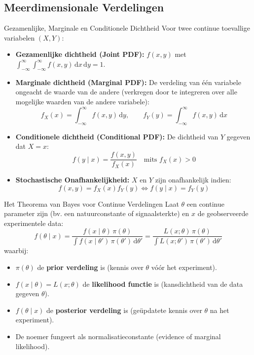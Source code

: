 \documentclass[11pt,a4paper]{article}
\newcommand{\dd}{\mathrm{d}}
\begin{document}
\subsection{Meerdimensionale Verdelingen}
\begin{defbox}{Gezamenlijke, Marginale en Conditionele Dichtheid}
Voor twee continue toevallige variabelen $(X, Y)$:
\begin{itemize}[leftmargin=1.2em]
    \item \textbf{Gezamenlijke dichtheid (Joint PDF):} $f(x, y)$ met $\int_{-\infty}^\infty \int_{-\infty}^\infty f(x, y) \, \dd x \, \dd y = 1$.
    \item \textbf{Marginale dichtheid (Marginal PDF):} De verdeling van één variabele ongeacht de waarde van de andere (verkregen door te integreren over alle mogelijke waarden van de andere variabele):
    \begin{equation}
        f_X(x) = \int_{-\infty}^\infty f(x, y) \, \dd y, \qquad f_Y(y) = \int_{-\infty}^\infty f(x, y) \, \dd x
    \end{equation}
    \item \textbf{Conditionele dichtheid (Conditional PDF):} De dichtheid van $Y$ gegeven dat $X = x$:
    \begin{equation}
        f(y \mid x) = \frac{f(x, y)}{f_X(x)} \quad \text{mits } f_X(x) > 0
    \end{equation}
    \item \textbf{Stochastische Onafhankelijkheid:} $X$ en $Y$ zijn onafhankelijk indien:
    \begin{equation}
        f(x, y) = f_X(x) f_Y(y) \iff f(y \mid x) = f_Y(y)
    \end{equation}
\end{itemize}
\end{defbox}

\begin{theobox}{Het Theorema van Bayes voor Continue Verdelingen}
Laat $\theta$ een continue parameter zijn (bv. een natuurconstante of signaalsterkte) en $x$ de geobserveerde experimentele data:
\begin{equation}
    f(\theta \mid x) = \frac{f(x \mid \theta) \, \pi(\theta)}{\int f(x \mid \theta') \, \pi(\theta') \, \dd \theta'} = \frac{L(x; \theta) \, \pi(\theta)}{\int L(x; \theta') \, \pi(\theta') \, \dd \theta'}
\end{equation}
waarbij:
\begin{itemize}
    \item $\pi(\theta)$ de \textbf{prior verdeling} is (kennis over $\theta$ vóór het experiment).
    \item $f(x \mid \theta) = L(x; \theta)$ de \textbf{likelihood functie} is (kansdichtheid van de data gegeven $\theta$).
    \item $f(\theta \mid x)$ de \textbf{posterior verdeling} is (geüpdatete kennis over $\theta$ na het experiment).
    \item De noemer fungeert als normalisatieconstante (evidence of marginal likelihood).
\end{itemize}
\end{theobox}
\end{document}
